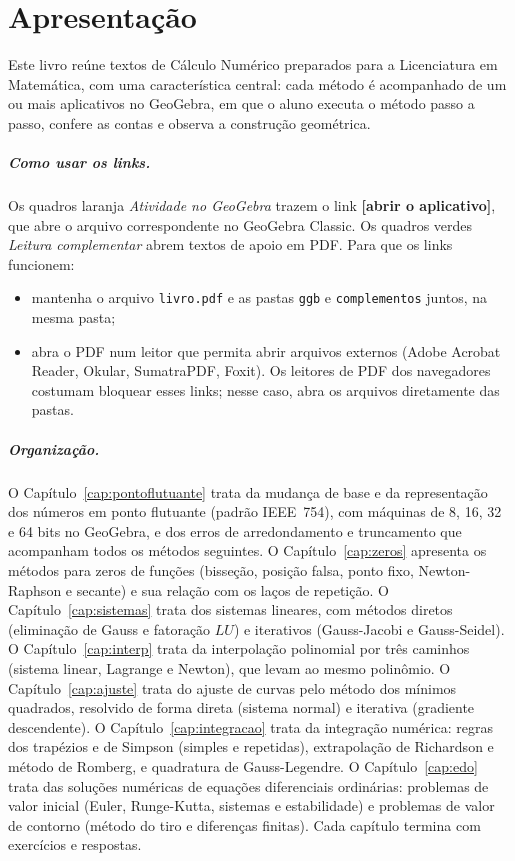 \documentclass[11pt,a4paper,oneside]{book}
\begin{document}
\frontmatter


\tableofcontents

\chapter{Apresentação}

Este livro reúne textos de Cálculo Numérico preparados para a Licenciatura em Matemática, com
uma característica central: cada método é acompanhado de um ou mais aplicativos no GeoGebra, em que
o aluno executa o método passo a passo, confere as contas e observa a construção geométrica.

\paragraph{Como usar os links.} Os quadros laranja \emph{Atividade no GeoGebra} trazem o link
\textbf{[abrir o aplicativo]}, que abre o arquivo correspondente no GeoGebra Classic. Os quadros
verdes \emph{Leitura complementar} abrem textos de apoio em PDF. Para que os links funcionem:
\begin{itemize}[nosep]
  \item mantenha o arquivo \texttt{livro.pdf} e as pastas \texttt{ggb} e \texttt{complementos} juntos,
        na mesma pasta;
  \item abra o PDF num leitor que permita abrir arquivos externos (Adobe Acrobat Reader, Okular,
        SumatraPDF, Foxit). Os leitores de PDF dos navegadores costumam bloquear esses links; nesse
        caso, abra os arquivos diretamente das pastas.
\end{itemize}

\paragraph{Organização.} O Capítulo~\ref{cap:pontoflutuante} trata da mudança de base e da
representação dos números em ponto flutuante (padrão IEEE~754), com máquinas de 8, 16, 32 e 64 bits
no GeoGebra, e dos erros de arredondamento e truncamento que acompanham todos os métodos seguintes. O
Capítulo~\ref{cap:zeros} apresenta os métodos para zeros de funções (bisseção, posição falsa, ponto
fixo, Newton-Raphson e secante) e sua relação com os laços de repetição. O
Capítulo~\ref{cap:sistemas} trata dos sistemas lineares, com métodos
diretos (eliminação de Gauss e fatoração $LU$) e iterativos (Gauss-Jacobi e Gauss-Seidel).  O
Capítulo~\ref{cap:interp} trata da interpolação polinomial por três caminhos (sistema linear,
Lagrange e Newton), que levam ao mesmo polinômio. O Capítulo~\ref{cap:ajuste} trata do ajuste de curvas
pelo método dos mínimos quadrados, resolvido de forma direta (sistema normal) e iterativa (gradiente
descendente). O Capítulo~\ref{cap:integracao} trata da integração numérica: regras dos trapézios
e de Simpson (simples e repetidas), extrapolação de Richardson e método de Romberg, e quadratura de
Gauss-Legendre. O Capítulo~\ref{cap:edo} trata das soluções numéricas de equações diferenciais
ordinárias: problemas de valor inicial (Euler, Runge-Kutta, sistemas e estabilidade) e problemas de
valor de contorno (método do tiro e diferenças finitas). Cada capítulo termina com exercícios e respostas.

\mainmatter








\end{document}
